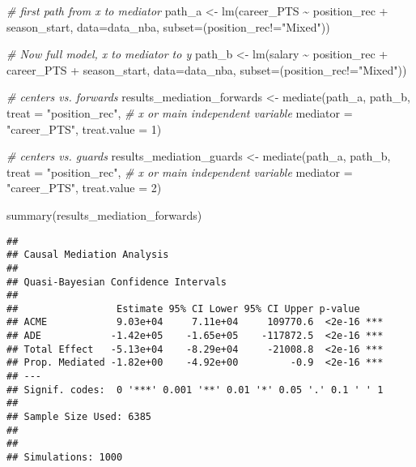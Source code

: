 \documentclass[
]{book}
\newenvironment{Shaded}{\begin{snugshade}}{\end{snugshade}}
\newcommand{\AttributeTok}[1]{\textcolor[rgb]{0.77,0.63,0.00}{#1}}
\newcommand{\CommentTok}[1]{\textcolor[rgb]{0.56,0.35,0.01}{\textit{#1}}}
\newcommand{\DecValTok}[1]{\textcolor[rgb]{0.00,0.00,0.81}{#1}}
\newcommand{\FunctionTok}[1]{\textcolor[rgb]{0.00,0.00,0.00}{#1}}
\newcommand{\NormalTok}[1]{#1}
\newcommand{\OtherTok}[1]{\textcolor[rgb]{0.56,0.35,0.01}{#1}}
\newcommand{\SpecialCharTok}[1]{\textcolor[rgb]{0.00,0.00,0.00}{#1}}
\newcommand{\StringTok}[1]{\textcolor[rgb]{0.31,0.60,0.02}{#1}}
\begin{document}
\begin{Shaded}
\begin{Highlighting}[]
\CommentTok{\# first path from x to mediator}
\NormalTok{path\_a }\OtherTok{\textless{}{-}} \FunctionTok{lm}\NormalTok{(career\_PTS }\SpecialCharTok{\textasciitilde{}}\NormalTok{ position\_rec }\SpecialCharTok{+}\NormalTok{ season\_start, }\AttributeTok{data=}\NormalTok{data\_nba, }\AttributeTok{subset=}\NormalTok{(position\_rec}\SpecialCharTok{!=}\StringTok{"Mixed"}\NormalTok{))}

\CommentTok{\# Now full model, x to mediator to y}
\NormalTok{path\_b }\OtherTok{\textless{}{-}} \FunctionTok{lm}\NormalTok{(salary }\SpecialCharTok{\textasciitilde{}}\NormalTok{ position\_rec }\SpecialCharTok{+}\NormalTok{ career\_PTS }\SpecialCharTok{+}\NormalTok{ season\_start, }\AttributeTok{data=}\NormalTok{data\_nba, }\AttributeTok{subset=}\NormalTok{(position\_rec}\SpecialCharTok{!=}\StringTok{"Mixed"}\NormalTok{))}

\CommentTok{\# centers vs. forwards}
\NormalTok{results\_mediation\_forwards }\OtherTok{\textless{}{-}} \FunctionTok{mediate}\NormalTok{(path\_a, path\_b,}
                             \AttributeTok{treat =} \StringTok{"position\_rec"}\NormalTok{, }\CommentTok{\# x or main independent variable}
                             \AttributeTok{mediator =} \StringTok{"career\_PTS"}\NormalTok{,}
                             \AttributeTok{treat.value =} \DecValTok{1}\NormalTok{)}

\CommentTok{\# centers vs. guards}
\NormalTok{results\_mediation\_guards }\OtherTok{\textless{}{-}} \FunctionTok{mediate}\NormalTok{(path\_a, path\_b,}
                             \AttributeTok{treat =} \StringTok{"position\_rec"}\NormalTok{, }\CommentTok{\# x or main independent variable}
                             \AttributeTok{mediator =} \StringTok{"career\_PTS"}\NormalTok{,}
                             \AttributeTok{treat.value =} \DecValTok{2}\NormalTok{)}

\FunctionTok{summary}\NormalTok{(results\_mediation\_forwards)}
\end{Highlighting}
\end{Shaded}

\begin{verbatim}
## 
## Causal Mediation Analysis 
## 
## Quasi-Bayesian Confidence Intervals
## 
##                 Estimate 95% CI Lower 95% CI Upper p-value    
## ACME            9.03e+04     7.11e+04     109770.6  <2e-16 ***
## ADE            -1.42e+05    -1.65e+05    -117872.5  <2e-16 ***
## Total Effect   -5.13e+04    -8.29e+04     -21008.8  <2e-16 ***
## Prop. Mediated -1.82e+00    -4.92e+00         -0.9  <2e-16 ***
## ---
## Signif. codes:  0 '***' 0.001 '**' 0.01 '*' 0.05 '.' 0.1 ' ' 1
## 
## Sample Size Used: 6385 
## 
## 
## Simulations: 1000
\end{verbatim}
\end{document}
